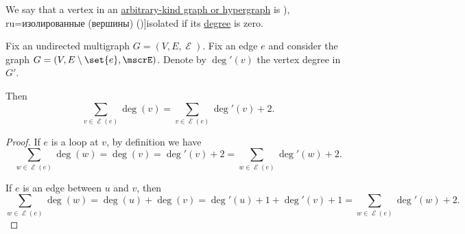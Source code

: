 \begin{definition}\label{def:isolated_vertex}
  We say that a vertex in an \hyperref[rem:arbitrary_kind_graph]{arbitrary-kind graph or hypergraph} is \term[bg=изолирани (върхове) (\cite[8]{Мирчев2001Графи}), ru=изолированные (вершины) (\cite[26]{ЕмеличевИПр1990Графы})]{isolated} if its \hyperref[def:graph_cardinality/directed_degree]{degree} is zero.
\end{definition}

\begin{lemma}\label{thm:sum_of_endpoint_degrees}
  Fix an undirected multigraph \( G = (V, E, \mscrE) \). Fix an edge \( e \) and consider the graph \( G = (V, E \setminus \set{ e }, \mscrE) \). Denote by \( \deg'(v) \) the vertex degree in \( G' \).

  Then
  \begin{equation}\label{eq:thm:sum_of_endpoint_degrees}
    \sum_{v \in \mscrE(e)} \deg(v) = \sum_{v \in \mscrE(e)} \deg'(v) + 2.
  \end{equation}
\end{lemma}
\begin{proof}
  If \( e \) is a loop at \( v \), by definition we have
  \begin{equation*}
    \sum_{w \in \mscrE(e)} \deg(w) = \deg(v) = \deg'(v) + 2 = \sum_{w \in \mscrE(e)} \deg'(w) + 2.
  \end{equation*}

  If \( e \) is an edge between \( u \) and \( v \), then
  \begin{equation*}
    \sum_{w \in \mscrE(e)} \deg(w)
    =
    \deg(u) + \deg(v)
    =
    \deg'(u) + 1 + \deg'(v) + 1
    =
    \sum_{w \in \mscrE(e)} \deg'(w) + 2.
  \end{equation*}
\end{proof}

